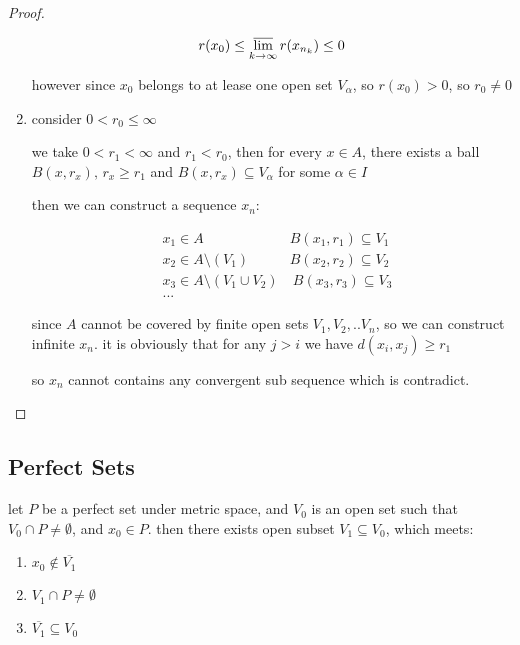 \begin{proof}
\begin{enumerate}
        \[
            r(x_0) \le \varlimsup_{k \to \infty}r(x_{n_{k}}) \le 0
        \]

        however since $x_0$ belongs to at lease one open set $V_{\alpha}$, so $r(x_0) > 0$, 
        so $r_0 \ne 0 $

        \item consider $0 < r_0 \le \infty$

        we  take $0 < r_1 < \infty$ and $r_1 < r_0$, then for every $x \in A$, there exists
        a ball $B(x, r_x),\, r_x \ge r_1$ and $B(x, r_x) \subseteq V_{\alpha}$ for some $\alpha \in I$

        then we can construct a sequence $x_n$:

        \begin{align*}
            & x_1 \in A\: & B(x_1, r_1) \subseteq V_{1} \\
            & x_2 \in A \setminus (V_1)\: & B(x_2, r_2) \subseteq V_2 \\
            & x_3 \in A \setminus (V_1 \cup V_2) & \: B(x_3, r_3) \subseteq V_3 \\
            & ...
        \end{align*}

        since $A$ cannot be covered by finite open sets $V_1, V_2, .. V_n$, so we can construct infinite $x_n$.
        it is obviously that for any $j > i$ we have $d(x_i, x_j) \ge r_1$

        so $x_n$ cannot contains any convergent sub sequence which is contradict.



    \end{enumerate}
\end{proof}

\subsection{Perfect Sets}

\begin{lem}
    \label{lem:2-4-1}
    let $P$ be a perfect set under metric space, and $V_0$ is an open set such that $V_0 \cap P \ne \emptyset$, and $x_0 \in P$.
    then there exists open subset $V_1 \subseteq V_0$, which meets:

    \begin{enumerate}
        \item $x_0 \notin \overline{V_1}$
        \item $V_1 \cap P \ne \emptyset$
        \item $\overline{V_1} \subseteq V_0$
    \end{enumerate}
\end{lem}

